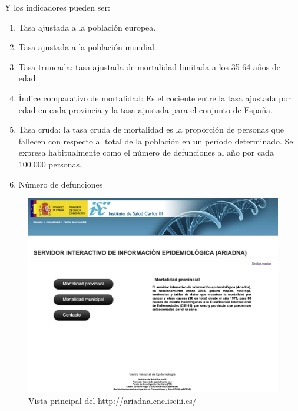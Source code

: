 Y los indicadores pueden ser:
\begin{enumerate}
  \item Tasa ajustada a la población europea.
  \item Tasa ajustada a la población mundial.
  \item Tasa truncada: tasa ajustada de mortalidad limitada a los 35-64 años de edad.
  \item Índice comparativo de mortalidad: Es el cociente entre la tasa ajustada por edad en cada provincia y la tasa
  ajustada para el conjunto de España.
  \item Tasa cruda: la tasa cruda de mortalidad es la proporción de personas que fallecen con respecto al total
  de la población en un período determinado. Se expresa habitualmente como el número de defunciones al año
  por cada 100.000 personas.
  \item Número de defunciones
\end{enumerate}
\FloatBarrier
\begin{figure}[]
	\centering
	\includegraphics[scale=0.5]{doc/logos/imgs/ariadna1.png}
	\caption{ Vista principal del \href{servidor Ariadna}{http://ariadna.cne.isciii.es/} }
    \label{fig:worst_f_value}
\end{figure}

